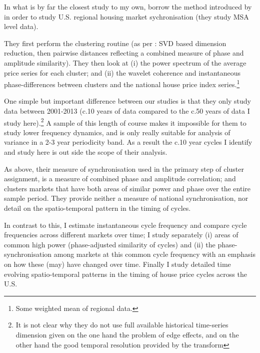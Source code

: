 \documentclass[11pt]{article}
\begin{document}

In what is by far the closest study to my own, \cite{Flor2017} borrow the method introduced by \cite{Aguiar-Conraria2011} in order to study U.S. regional housing market sychronisation (they study MSA level data). 

They first perform the clustering routine (as per \cite{Aguiar-Conraria2011}: SVD based dimension reduction, then pairwise distances reflecting a combined measure of phase and amplitude similarity). They then look at (i) the power spectrum of the average price series for each cluster; %
and (ii) the wavelet coherence and instantaneous phase-differences between clusters and the national house price index series.\footnote{Some weighted mean of regional data.}

One simple but important difference between our studies is that they only study data between 2001-2013 (c.10 years of data compared to the c.50 years of data I study here).\footnote{It is not clear why they do not use full available historical time-series dimension given on the one hand the problem of edge effects, and on the other hand the good temporal resolution provided by the transform} 
A sample of this length of course makes it impossible for them to study lower frequency dynamics, and is only really suitable for analysis of variance in a 2-3 year periodicity band. As a result the c.10 year cycles I identify and study here is out side the scope of their analysis.

As above, their measure of synchronisation used in the primary step of cluster assignment, is a measure of combined phase and amplitude correlation; and %
clusters markets that have both areas of similar power and phase over the entire sample period. They provide neither a measure of national synchronisation, nor detail on the spatio-temporal pattern in the timing of cycles.

In contrast to this,  I estimate instantaneous cycle frequency %
and compare cycle frequencies across different markets over time; I study separately (i) areas of common high power (phase-adjusted similarity of cycles) and (ii) the phase-synchronisation among markets at this common cycle frequency with an emphasis on how these (may) have changed over time. Finally I study detailed time evolving spatio-temporal patterns in the timing of house price cycles across the U.S.
\end{document}
